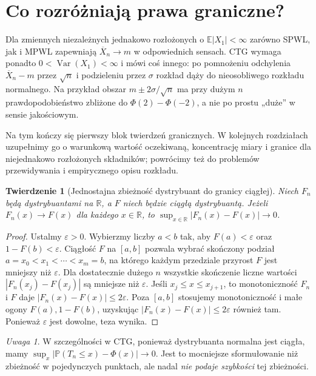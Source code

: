 \documentclass[11pt,a4paper,oneside]{report}
\numberwithin{equation}{chapter}
\theoremstyle{plain}
\newtheorem{twierdzenie}{Twierdzenie}[chapter]
\theoremstyle{definition}
\theoremstyle{remark}
\newtheorem{uwaga}{Uwaga}[chapter]
\newcommand{\R}{\mathbb{R}}
\newcommand{\Prob}{\mathbb{P}}
\newcommand{\E}{\mathbb{E}}
\newcommand{\Var}{\operatorname{Var}}
\begin{document}
\section{Co rozróżniają prawa graniczne?}

Dla zmiennych niezależnych jednakowo rozłożonych o
$\E|X_1|<\infty$ zarówno SPWL, jak i MPWL zapewniają
$\overline X_n\to m$ w odpowiednich sensach.
CTG wymaga ponadto $0<\Var(X_1)<\infty$ i mówi
coś innego: po pomnożeniu odchylenia $\overline X_n-m$
przez $\sqrt n$ i podzieleniu przez $\sigma$ rozkład
dąży do nieosobliwego rozkładu normalnego.
Na przykład obszar $m\pm 2\sigma/\sqrt n$ ma
przy dużym $n$ prawdopodobieństwo zbliżone do
$\Phi(2)-\Phi(-2)$, a nie po prostu „duże” w sensie
jakościowym.

Na tym kończy się pierwszy blok twierdzeń granicznych.
W kolejnych rozdziałach uzupełnimy go o warunkową wartość
oczekiwaną, koncentrację miary i granice dla
niejednakowo rozłożonych składników; powrócimy też
do problemów przewidywania i empirycznego opisu rozkładu.

\begin{twierdzenie}[Jednostajna zbieżność dystrybuant do granicy ciągłej]
Niech $F_n$ będą dystrybuantami na $\R$, a $F$
niech będzie \emph{ciągłą} dystrybuantą.
Jeżeli $F_n(x)\to F(x)$ dla każdego $x\in\R$,
to $\sup_{x\in\R}|F_n(x)-F(x)|\to0$.
\end{twierdzenie}
\begin{proof}
Ustalmy $\varepsilon>0$. Wybierzmy liczby $a<b$
tak, aby $F(a)<\varepsilon$ oraz
$1-F(b)<\varepsilon$. Ciągłość $F$ na $[a,b]$
pozwala wybrać skończony podział
$a=x_0<x_1<\cdots<x_m=b$, na którego
każdym przedziale przyrost $F$ jest mniejszy
niż $\varepsilon$. Dla dostatecznie dużego $n$
wszystkie skończenie liczne wartości
$|F_n(x_j)-F(x_j)|$ są mniejsze niż $\varepsilon$.
Jeśli $x_j\leq x\leq x_{j+1}$,
to monotoniczność $F_n$ i $F$ daje
$|F_n(x)-F(x)|\leq2\varepsilon$.
Poza $[a,b]$ stosujemy monotoniczność
i małe ogony $F(a),1-F(b)$, uzyskując
$|F_n(x)-F(x)|\leq2\varepsilon$ również tam.
Ponieważ $\varepsilon$ jest dowolne, teza wynika.
\end{proof}

\begin{uwaga}
W szczególności w CTG, ponieważ dystrybuanta
normalna jest ciągła, mamy
$\sup_x|\Prob(T_n\leq x)-\Phi(x)|\to0$.
Jest to mocniejsze sformułowanie niż zbieżność
w pojedynczych punktach, ale nadal \emph{nie podaje
szybkości} tej zbieżności.
\end{uwaga}
\end{document}
